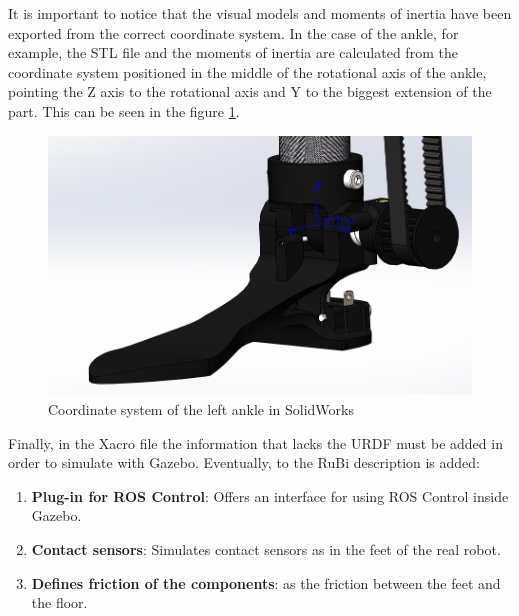 It is important to notice that the visual models and moments of inertia have been exported from the correct coordinate system.
In the case of the ankle, for example, the STL file and the moments of inertia are calculated from the coordinate system positioned in the middle of the rotational axis of the ankle, pointing the Z axis to the rotational axis and Y to the biggest extension of the part.
This can be seen in the figure \ref{fig:solidworks_ankle_coodinate_system}.

\begin{figure}[ht!]
  \centering
  \includegraphics[width=0.75\linewidth]{figures/solidworks_ankle_coordinate_system}
  \caption{Coordinate system of the left ankle in SolidWorks}
  \label{fig:solidworks_ankle_coodinate_system}
\end{figure}

Finally, in the Xacro file the information that lacks the URDF must be added in order to simulate with Gazebo.
Eventually, to the RuBi description is added:
\begin{enumerate}
  \item \textbf{Plug-in for ROS Control}: Offers an interface for using ROS Control inside Gazebo.
  \item \textbf{Contact sensors}: Simulates contact sensors as in the feet of the real robot.
  \item \textbf{Defines friction of the components}: as the friction between the feet and the floor.
\end{enumerate}

